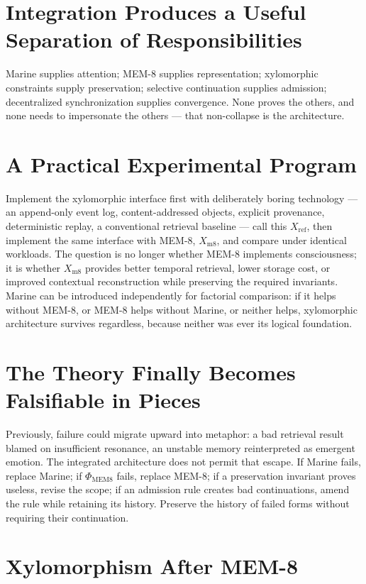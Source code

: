 \documentclass[12pt]{article}
\begin{document}
\section{Integration Produces a Useful Separation of Responsibilities}

Marine supplies attention; MEM-8 supplies representation; xylomorphic constraints supply preservation; selective continuation supplies admission; decentralized synchronization supplies convergence. None proves the others, and none needs to impersonate the others — that non-collapse is the architecture.

\section{A Practical Experimental Program}

Implement the xylomorphic interface first with deliberately boring technology — an append-only event log, content-addressed objects, explicit provenance, deterministic replay, a conventional retrieval baseline — call this $X_{\mathrm{ref}}$, then implement the same interface with MEM-8, $X_{\mathrm{m8}}$, and compare under identical workloads. The question is no longer whether MEM-8 implements consciousness; it is whether $X_{\mathrm{m8}}$ provides better temporal retrieval, lower storage cost, or improved contextual reconstruction while preserving the required invariants. Marine can be introduced independently for factorial comparison: if it helps without MEM-8, or MEM-8 helps without Marine, or neither helps, xylomorphic architecture survives regardless, because neither was ever its logical foundation.

\section{The Theory Finally Becomes Falsifiable in Pieces}

Previously, failure could migrate upward into metaphor: a bad retrieval result blamed on insufficient resonance, an unstable memory reinterpreted as emergent emotion. The integrated architecture does not permit that escape. If Marine fails, replace Marine; if $\Phi_{\mathrm{MEM8}}$ fails, replace MEM-8; if a preservation invariant proves useless, revise the scope; if an admission rule creates bad continuations, amend the rule while retaining its history. Preserve the history of failed forms without requiring their continuation.

\section{Xylomorphism After MEM-8}
\end{document}
